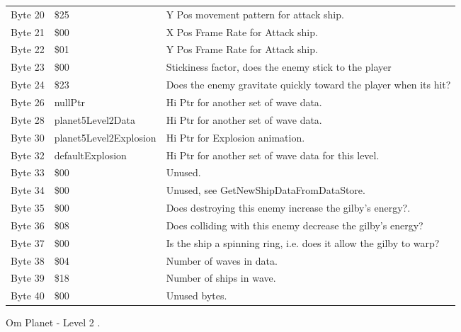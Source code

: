 \begin{figure}[H]
{\begin{adjustbox}{width=12cm}
\begin{tabular}{lll}
 Byte 20 & \$25                    & Y Pos movement pattern for attack ship.                            \\
 Byte 21 & \$00                    & X Pos Frame Rate for Attack ship.                                  \\
 Byte 22 & \$01                    & Y Pos Frame Rate for Attack ship.                                  \\
 Byte 23 & \$00                    & Stickiness factor, does the enemy stick to the player              \\
 Byte 24 & \$23                    & Does the enemy gravitate quickly toward the player when its hit?   \\
 Byte 26 & nullPtr                & Hi Ptr for another set of wave data.                               \\
 Byte 28 & planet5Level2Data      & Hi Ptr for another set of wave data.                               \\
 Byte 30 & planet5Level2Explosion & Hi Ptr for Explosion animation.                                    \\
 Byte 32 & defaultExplosion       & Hi Ptr for another set of wave data for this level.                \\
 Byte 33 & \$00                    & Unused.                                                            \\
 Byte 34 & \$00                    & Unused, see GetNewShipDataFromDataStore.                           \\
 Byte 35 & \$00                    & Does destroying this enemy increase the gilby's energy?.           \\
 Byte 36 & \$08                    & Does colliding with this enemy decrease the gilby's energy?        \\
 Byte 37 & \$00                    & Is the ship a spinning ring, i.e. does it allow the gilby to warp? \\
 Byte 38 & \$04                    & Number of waves in data.                                           \\
 Byte 39 & \$18                    & Number of ships in wave.                                           \\
 Byte 40 & \$00                    & Unused bytes.                                                      \\
\bottomrule
\end{tabular}

  \end{adjustbox}

  }\caption*{Om Planet - Level 2
.}
\end{figure}

